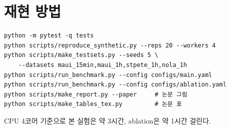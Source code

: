 \documentclass[11pt,a4paper]{article}
\begin{document}
\section{재현 방법}
{\small\begin{verbatim}
python -m pytest -q tests
python scripts/reproduce_synthetic.py --reps 20 --workers 4
python scripts/make_testsets.py --seeds 5 \
    --datasets maui_15min,maui_1h,stpete_1h,nola_1h
python scripts/run_benchmark.py --config configs/main.yaml
python scripts/run_benchmark.py --config configs/ablation.yaml
python scripts/make_report.py --paper     # 논문 그림
python scripts/make_tables_tex.py         # 논문 표
\end{verbatim}}
CPU 4코어 기준으로 본 실험은 약 3시간, ablation은 약 1시간 걸린다.
\end{document}
